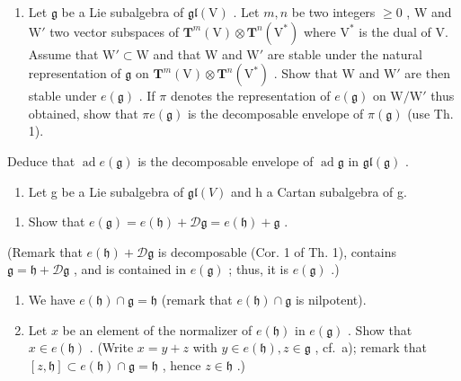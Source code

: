 \begin{enumerate}
\def\labelenumi{\arabic{enumi})}
\setcounter{enumi}{6}
\tightlist
\item
  Let \(\mathfrak{g}\) be a Lie subalgebra of \(\mathfrak{gl}(\mathrm{V})\) . Let \(m, n\) be two integers \(\geq 0\) , W and \(\mathrm{W}'\) two vector subspaces of \(\mathbf{T}^m(\mathrm{V}) \otimes \mathbf{T}^n(\mathrm{V}^*)\) where \(\mathrm{V}^*\) is the dual of V. Assume that \(\mathrm{W}' \subset \mathrm{W}\) and that W and \(\mathrm{W}'\) are stable under the natural representation of \(\mathfrak{g}\) on \(\mathbf{T}^m(\mathrm{V}) \otimes \mathbf{T}^n(\mathrm{V}^*)\) . Show that W and \(\mathrm{W}'\) are then stable under \(e(\mathfrak{g})\) . If \(\pi\) denotes the representation of \(e(\mathfrak{g})\) on \(\mathrm{W/W}'\) thus obtained, show that \(\pi e(\mathfrak{g})\) is the decomposable envelope of \(\pi(\mathfrak{g})\) (use Th. 1).
\end{enumerate}

Deduce that \(\operatorname{ad} e(\mathfrak{g})\) is the decomposable envelope of \(\operatorname{ad} \mathfrak{g}\) in \(\mathfrak{gl}(\mathfrak{g})\) .

\begin{enumerate}
\def\labelenumi{\arabic{enumi})}
\setcounter{enumi}{7}
\tightlist
\item
  Let g be a Lie subalgebra of \(\mathfrak{gl}(V)\) and h a Cartan subalgebra of g.
\end{enumerate}

\begin{enumerate}
\def\labelenumi{\alph{enumi})}
\tightlist
\item
  Show that \(e(\mathfrak{g}) = e(\mathfrak{h}) + \mathcal{D}\mathfrak{g} = e(\mathfrak{h}) + \mathfrak{g}\) .
\end{enumerate}

(Remark that \(e(\mathfrak{h}) + \mathcal{D}\mathfrak{g}\) is decomposable (Cor. 1 of Th. 1), contains \(\mathfrak{g} = \mathfrak{h} + \mathcal{D}\mathfrak{g}\) , and is contained in \(e(\mathfrak{g})\) ; thus, it is \(e(\mathfrak{g})\) .)

\begin{enumerate}
\def\labelenumi{\alph{enumi})}
\setcounter{enumi}{1}
\item
  We have \(e(\mathfrak{h}) \cap \mathfrak{g} = \mathfrak{h}\) (remark that \(e(\mathfrak{h}) \cap \mathfrak{g}\) is nilpotent).
\item
  Let \(x\) be an element of the normalizer of \(e(\mathfrak{h})\) in \(e(\mathfrak{g})\) . Show that \(x \in e(\mathfrak{h})\) . (Write \(x = y + z\) with \(y \in e(\mathfrak{h}), z \in \mathfrak{g}\) , cf.~a); remark that \([z, \mathfrak{h}] \subset e(\mathfrak{h}) \cap \mathfrak{g} = \mathfrak{h}\) , hence \(z \in \mathfrak{h}\) .)
\end{enumerate}

